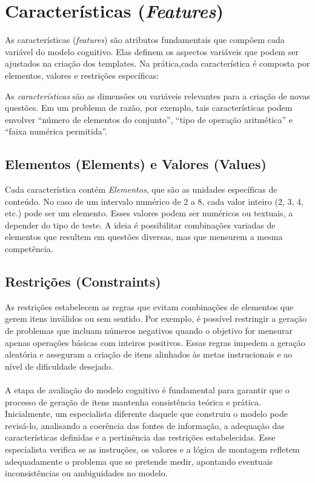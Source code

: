 \section{Características (\textit{Features})}



As características (\textit{features}) são atributos fundamentais que compõem cada variável do modelo cognitivo. Elas definem os aspectos variáveis que podem ser ajustados na criação dos templates. Na prática,cada característica é composta por elementos, valores e restrições específicas:


As \emph{características} são as dimensões ou variáveis relevantes para a criação de novas questões. Em um problema de razão, por exemplo, tais características podem envolver “número de elementos do conjunto”, “tipo de operação aritmética” e “faixa numérica permitida”.

\subsection{Elementos (Elements) e Valores (Values)}
Cada característica contém \emph{Elementos}, que são as unidades específicas de conteúdo. No caso de um intervalo numérico de 2 a 8, cada valor inteiro (2, 3, 4, etc.) pode ser um elemento. Esses valores podem ser numéricos ou textuais, a depender do tipo de teste. A ideia é possibilitar combinações variadas de elementos que resultem em questões diversas, mas que mensurem a mesma competência.

\subsection{Restrições (Constraints)}
As restrições estabelecem as regras que evitam combinações de elementos que gerem itens inválidos ou sem sentido. Por exemplo, é possível restringir a geração de problemas que incluam números negativos quando o objetivo for mensurar apenas operações básicas com inteiros positivos. Essas regras impedem a geração aleatória e asseguram a criação de itens alinhados às metas instrucionais e ao nível de dificuldade desejado.



\paragraph{}A etapa de avaliação do modelo cognitivo é fundamental para garantir que o processo de geração de itens mantenha consistência teórica e prática. Inicialmente, um especialista diferente daquele que construiu o modelo pode revisá-lo, analisando a coerência das fontes de informação, a adequação das características definidas e a pertinência das restrições estabelecidas. Esse especialista verifica se as instruções, os valores e a lógica de montagem refletem adequadamente o problema que se pretende medir, apontando eventuais inconsistências ou ambiguidades no modelo.

